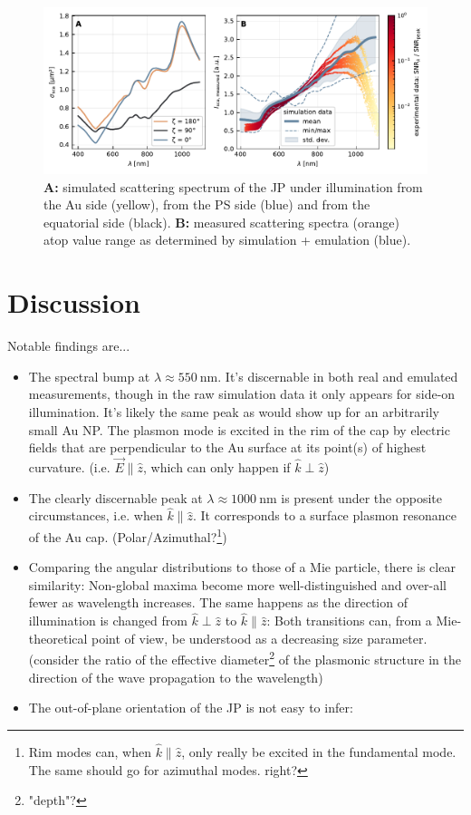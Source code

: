\documentclass[10pt]{article}
\begin{document}
\begin{multicols}{2}
\begin{figure}[t]
    \centering
    \includegraphics{[fig] spectra.PDF}
    \caption{{\sffamily\bfseries A:} simulated scattering spectrum of the JP under illumination from the Au side (yellow), from the PS side (blue) and from the equatorial side (black). {\sffamily\bfseries B:} measured scattering spectra (orange) atop value range as determined by simulation + emulation (blue).}
    \label{fig:spectra}
\end{figure}

\section*{Discussion}

Notable findings are...
\begin{itemize}
    \item The spectral bump at $\lambda\approx\SI{550}{\nano\meter}$. It's discernable in both real and emulated measurements, though in the raw simulation data it only appears for side-on illumination. 
    It's likely the same peak as would show up for an arbitrarily small Au NP. 
    The plasmon mode is excited in the rim of the cap by electric fields that are perpendicular to the Au surface at its point(s) of highest curvature. (i.e. $\vec{E} \parallel \hat{z}$, which can only happen if $\hat{k} \perp \hat{z}$)
    \item The clearly discernable peak at $\lambda\approx\SI{1000}{\nano\meter}$ is present under the opposite circumstances, i.e. when $\hat{k}\parallel\hat{z}$. 
    It corresponds to a surface plasmon resonance of the Au cap. (Polar/Azimuthal?\footnote{Rim modes can, when $\hat{k}\parallel\hat{z}$, only really be excited in the fundamental mode. The same should go for azimuthal modes. right?})
    \item Comparing the angular distributions to those of a Mie particle, there is clear similarity: 
    Non-global maxima become more well-distinguished and over-all fewer as wavelength increases. 
    The same happens as the direction of illumination is changed from $\hat{k}\perp\hat{z}$ to $\hat{k}\parallel\hat{z}$: Both transitions can, from a Mie-theoretical point of view, be understood as a decreasing size parameter. (consider the ratio of the effective diameter\footnote{"depth"?} of the plasmonic structure in the direction of the wave propagation to the wavelength)  
    \item The out-of-plane orientation of the JP is not easy to infer: 
\end{itemize}


\end{multicols}
\end{document}
